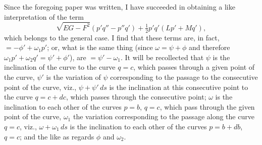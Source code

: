 \documentclass[11pt,a4paper]{book}
\begin{document}
Since the foregoing paper was written, I have succeeded in obtaining a like interpretation of the term
\[
\sqrt{EG - F^2}(p'q'' - p''q') + \tfrac{1}{2}p'q'(Lp' + Mq'),
\]
which belongs to the general case. I find that these terms are, in fact, $= -\phi' + \omega_1 p'$; or, what is the same thing (since $\omega = \psi + \phi$ and therefore $\omega_1 p' + \omega_2 q' = \psi' + \phi'$), are $= \psi' - \omega_1$. It will be recollected that $\psi$ is the inclination of the curve to the curve $q = c$, which passes through a given point of the curve, $\psi'$ is the variation of $\psi$ corresponding to the passage to the consecutive point of the curve, viz., $\psi + \psi'\,ds$ is the inclination at this consecutive point to the curve $q = c + dc$, which passes through the consecutive point; $\omega$ is the inclination to each other of the curves $p = b$, $q = c$, which pass through the given point of the curve, $\omega_1$ the variation corresponding to the passage along the curve $q = c$, viz., $\omega + \omega_1\,ds$ is the inclination to each other of the curves $p = b + db$, $q = c$; and the like as regards $\phi$ and $\omega_2$.
\end{document}
